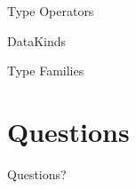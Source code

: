\documentclass[xcolor={usenames,dvipsnames}]{beamer}
\begin{document}
\begin{frame}[fragile]{Type Operators}
\end{frame}

\begin{frame}[fragile]{DataKinds}
\end{frame}

\begin{frame}[fragile]{Type Families}
\end{frame}


\section{Questions}

\begin{frame}
  Questions?
\end{frame}
\end{document}
